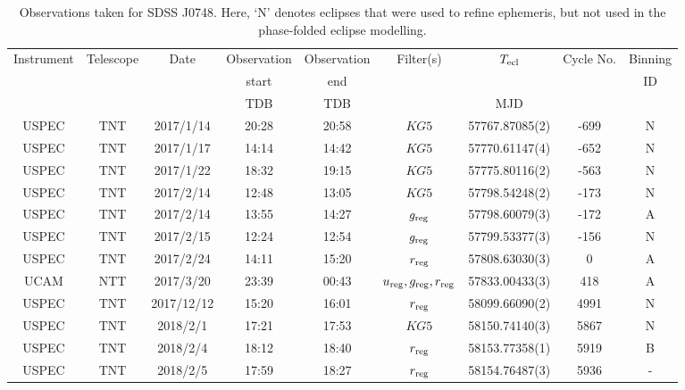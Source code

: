 \begin{table}
	\begin{center}
		\caption{Observations taken for SDSS J0748. Here, `N' denotes eclipses that were used to refine ephemeris, but not used in the phase-folded eclipse modelling.}
		\label{table:observing:observation logs SDSS0748}
		\begin{tabular}{ccccccccc}
			\hline
			Instrument & Telescope & Date & Observation  & Observation  & Filter(s) & $T_{\rm ecl}$ & Cycle No. & Binning \\
			 &  &  &  start &  end &  &  &  & ID \\
			 &  &  & TDB & TDB &  & MJD &  &  \\
			\hline
			\hline
			USPEC & TNT     & 2017/1/14  & 20:28 & 20:58 & $KG5$                                 & 57767.87085(2) &  -699 & N \\
			USPEC & TNT     & 2017/1/17  & 14:14 & 14:42 & $KG5$                                 & 57770.61147(4) &  -652 & N \\
			USPEC & TNT     & 2017/1/22  & 18:32 & 19:15 & $KG5$                                 & 57775.80116(2) &  -563 & N \\
			USPEC & TNT     & 2017/2/14  & 12:48 & 13:05 & $KG5$                                 & 57798.54248(2) &  -173 & N \\
			USPEC & TNT     & 2017/2/14  & 13:55 & 14:27 & $g_{\rm reg}$                         & 57798.60079(3) &  -172 & A \\
			USPEC & TNT     & 2017/2/15  & 12:24 & 12:54 & $g_{\rm reg}$                         & 57799.53377(3) &  -156 & N \\
			USPEC & TNT     & 2017/2/24  & 14:11 & 15:20 & $r_{\rm reg}$                         & 57808.63030(3) &     0 & A \\
			UCAM  & NTT     & 2017/3/20  & 23:39 & 00:43 & $u_{\rm reg},g_{\rm reg},r_{\rm reg}$ & 57833.00433(3) &   418 & A \\
			USPEC & TNT     & 2017/12/12 & 15:20 & 16:01 & $r_{\rm reg}$                         & 58099.66090(2) &  4991 & N \\
			USPEC & TNT     & 2018/2/1   & 17:21 & 17:53 & $KG5$                                 & 58150.74140(3) &  5867 & N \\
			USPEC & TNT     & 2018/2/4   & 18:12 & 18:40 & $r_{\rm reg}$                         & 58153.77358(1) &  5919 & B \\
			USPEC & TNT     & 2018/2/5   & 17:59 & 18:27 & $r_{\rm reg}$                         & 58154.76487(3) &  5936 & - \\

\end{tabular}
\end{center}
\end{table}
